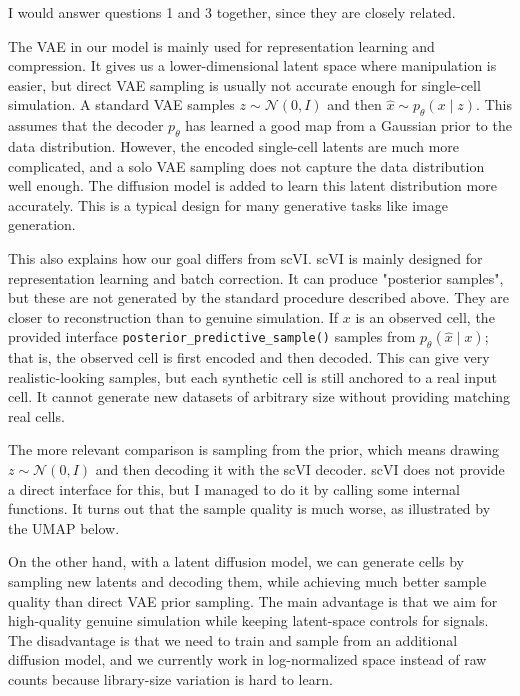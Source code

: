 \documentclass{article}
\begin{document}
\small

I would answer questions 1 and 3 together, since they are closely related.

The VAE in our model is mainly used for representation learning and
compression. It gives us a lower-dimensional latent space where manipulation is
easier, but direct VAE sampling is usually not accurate enough for single-cell
simulation. A standard VAE samples $z \sim \mathcal{N}(0,I)$ and then
$\hat{x} \sim p_\theta(x\mid z)$. This assumes that the decoder $p_\theta$ has
learned a good map from a Gaussian prior to the data distribution. However,
the encoded single-cell latents are much more complicated, and a solo VAE sampling does not capture the data distribution well enough. The diffusion model is added to
learn this latent distribution more accurately. This is a typical design for many generative tasks like image generation.

This also explains how our goal differs from scVI. scVI is mainly designed for
representation learning and batch correction. It can produce "posterior samples",
but these are not generated by the standard procedure described above. They are
closer to reconstruction than to genuine simulation. If $x$ is an observed
cell, the provided interface \texttt{posterior\_predictive\_sample()} samples
from $p_\theta(\hat{x}\mid x)$; that is, the observed cell is first encoded and
then decoded. This can give very realistic-looking samples, but each synthetic
cell is still anchored to a real input cell. It cannot generate new datasets of
arbitrary size without providing matching real cells.

The more relevant comparison is sampling from the prior, which means drawing
$z \sim \mathcal{N}(0,I)$ and then decoding it with the scVI decoder. scVI does
not provide a direct interface for this, but I managed to do it by calling some
internal functions. It turns out that the sample quality is much worse, as
illustrated by the UMAP below.

On the other hand, with a latent diffusion model, we can generate cells by
sampling new latents and decoding them, while achieving much better sample
quality than direct VAE prior sampling. The main advantage is that we aim for
high-quality genuine simulation while keeping latent-space controls for
signals. The disadvantage is that we need to train
and sample from an additional diffusion model, and we currently work in
log-normalized space instead of raw counts because library-size variation is hard to learn.
\end{document}
